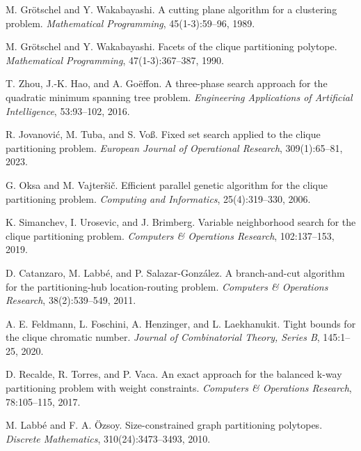 \documentclass[12pt,a4paper]{article}
\begin{document}

\begin{thebibliography}{99}

M. Grötschel and Y. Wakabayashi.
\newblock A cutting plane algorithm for a clustering problem.
\newblock \emph{Mathematical Programming}, 45(1-3):59--96, 1989.

M. Grötschel and Y. Wakabayashi.
\newblock Facets of the clique partitioning polytope.
\newblock \emph{Mathematical Programming}, 47(1-3):367--387, 1990.

T. Zhou, J.-K. Hao, and A. Goëffon.
\newblock A three-phase search approach for the quadratic minimum spanning tree problem.
\newblock \emph{Engineering Applications of Artificial Intelligence}, 53:93--102, 2016.

R. Jovanović, M. Tuba, and S. Voß.
\newblock Fixed set search applied to the clique partitioning problem.
\newblock \emph{European Journal of Operational Research}, 309(1):65--81, 2023.

G. Oksa and M. Vajteršič.
\newblock Efficient parallel genetic algorithm for the clique partitioning problem.
\newblock \emph{Computing and Informatics}, 25(4):319--330, 2006.

K. Simanchev, I. Urosevic, and J. Brimberg.
\newblock Variable neighborhood search for the clique partitioning problem.
\newblock \emph{Computers \& Operations Research}, 102:137--153, 2019.

D. Catanzaro, M. Labbé, and P. Salazar-González.
\newblock A branch-and-cut algorithm for the partitioning-hub location-routing problem.
\newblock \emph{Computers \& Operations Research}, 38(2):539--549, 2011.

A. E. Feldmann, L. Foschini, A. Henzinger, and L. Laekhanukit.
\newblock Tight bounds for the clique chromatic number.
\newblock \emph{Journal of Combinatorial Theory, Series B}, 145:1--25, 2020.

D. Recalde, R. Torres, and P. Vaca.
\newblock An exact approach for the balanced k-way partitioning problem with weight constraints.
\newblock \emph{Computers \& Operations Research}, 78:105--115, 2017.

M. Labbé and F. A. Özsoy.
\newblock Size-constrained graph partitioning polytopes.
\newblock \emph{Discrete Mathematics}, 310(24):3473--3493, 2010.

\end{thebibliography}
\end{document}
